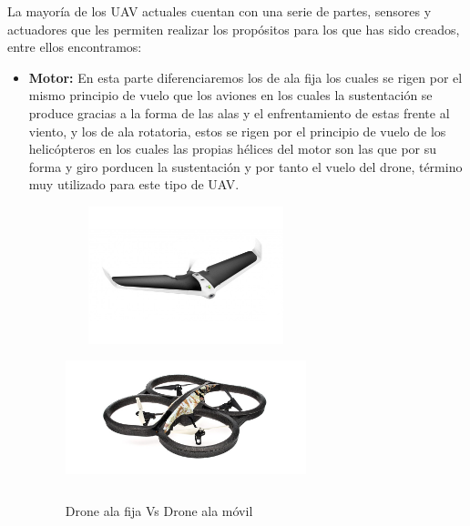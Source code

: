 \hspace{1cm} La mayoría de los UAV actuales cuentan con una serie de partes, sensores y actuadores que les permiten realizar los propósitos para los que has sido creados, entre ellos encontramos: 
	\begin{itemize}
		\item \textbf{Motor:} En esta parte diferenciaremos los de ala fija los cuales se rigen por el mismo principio de vuelo que los aviones en los cuales la sustentación se produce gracias a la forma de las alas y el enfrentamiento de estas frente al viento, y los de ala rotatoria, estos se rigen por el principio de vuelo de los helicópteros en los cuales las propias hélices del motor son las que por su forma y giro porducen la sustentación y por tanto el vuelo del drone, término muy utilizado para este tipo de UAV. 		
\begin{figure}[H]
 \centering
    \includegraphics[width=7cm,height=4cm]{imag/IMG15.jpeg}
    \includegraphics[width=7cm,height=4cm]{imag/IMG16.jpeg}
 \caption{Drone ala fija Vs Drone ala móvil}
 \label{f:Tipos de Drone}
\end{figure}


\end{itemize}
